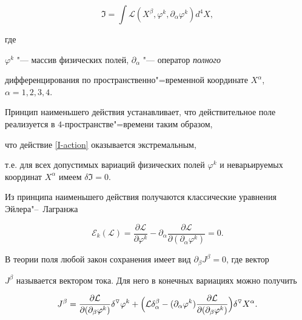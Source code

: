 \begin{equation}

\label{I-action}

\Im  = \int{{\mathcal L} (X^\beta,\varphi ^k,\partial_\alpha\varphi^k)d^4 X},

\end{equation}

где

$\varphi ^k$ "--- массив физических полей, $\partial_\alpha$  "--- оператор {\sl полного}

дифференцирования по пространственно"=временной координате $X^\alpha$, $\alpha=1, 2, 3, 4$.



Принцип наименьшего действия устанавливает, что действительное поле реализуется в $4$-пространстве"=времени таким образом,

что действие \eqref{I-action} оказывается экстремальным,

т.е. для всех допустимых вариаций физических полей $\varphi ^k$ и неварьируемых координат $X^\alpha$ имеем $\delta \Im  = 0$.



Из принципа наименьшего действия получаются классические уравнения Эйлера"--~Лагранжа

$$

{\mathcal E}_k({\mathcal L})=\frac{\partial{\mathcal L}}{\partial \varphi ^k}-\partial_{\alpha}\frac{\partial{\mathcal L}}{\partial (\partial _\alpha \varphi ^k)}=0.

$$



В теории поля любой закон сохранения имеет вид $\partial_\beta J^\beta = 0$, где  вектор

$J^\beta$  называется вектором тока. Для него в конечных вариациях можно получить

\begin{equation}

\label{noether43*}

J^\beta =

\displaystyle\frac{\partial{\mathcal L}}{\partial (\partial _\beta \varphi ^k)}{\delta}^{\triangledown} \varphi ^k+

\Bigl( {{\mathcal L}\delta _\alpha ^\beta -(\partial _\alpha \varphi ^k)\displaystyle\frac{\partial{\mathcal L}}{\partial (\partial _\beta \varphi ^k)}} \Bigr){\delta}^{\triangledown} X^\alpha.

\end{equation}



